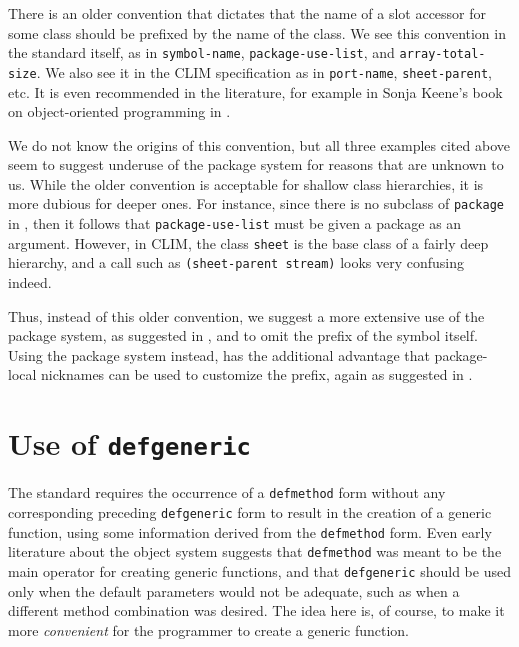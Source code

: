 There is an older convention that dictates that the name of a slot
accessor for some class should be prefixed by the name of the class.
We see this convention in the \commonlisp{} standard itself, as in
\texttt{symbol-name}, \texttt{package-use-list}, and
\texttt{array-total-size}.  We also see it in the CLIM
specification as in \texttt{port-name}, \texttt{sheet-parent}, etc.
It is even recommended in the literature, for example in Sonja Keene's
book on object-oriented programming in \commonlisp{}
\cite{sonya-keene}.

We do not know the origins of this convention, but all three examples
cited above seem to suggest underuse of the package system for reasons
that are unknown to us.  While the older convention is acceptable for
shallow class hierarchies, it is more dubious for deeper ones.  For
instance, since there is no subclass of \texttt{package} in
\commonlisp{}, then it follows that \texttt{package-use-list} must be
given a package as an argument.  However, in CLIM, the class
\texttt{sheet} is the base class of a fairly deep hierarchy, and
a call such as \texttt{(sheet-parent stream)} looks very confusing
indeed.

Thus, instead of this older convention, we suggest a more extensive
use of the package system, as suggested in
, and to omit the prefix of
the symbol itself.  Using the package system instead, has the
additional advantage that package-local nicknames can be used to
customize the prefix, again as suggested in
.

\section{Use of \texttt{defgeneric}}

The \commonlisp{} standard requires the occurrence of a
\texttt{defmethod} form without any corresponding preceding
\texttt{defgeneric} form to result in the creation of a generic
function, using some information derived from the \texttt{defmethod}
form.  Even early literature about the \commonlisp{} object system
\cite{Paeke:1993:OOP} suggests that \texttt{defmethod} was meant to be
the main operator for creating generic functions, and that
\texttt{defgeneric} should be used only when the default parameters
would not be adequate, such as when a different method combination was
desired.  The idea here is, of course, to make it more
\emph{convenient} for the programmer to create a generic function.

